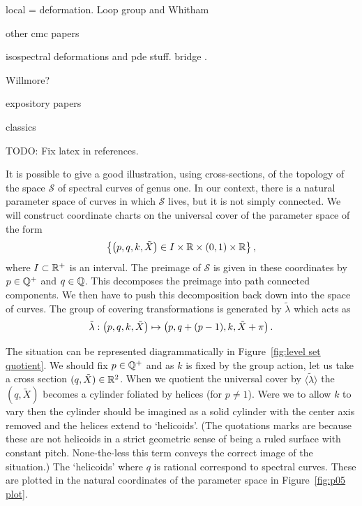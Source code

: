 \documentclass{article}
\begin{document}
local = deformation. Loop group and Whitham

other cmc papers \cite{Hauswirth2016}

isospectral deformations and pde stuff. bridge \cite{Kilian2010}. \cite{Flaschka1980}\cite{Krichever1995}

Willmore?

expository papers \cite{McIntosh2008}\cite{Carberry2013a}

classics \cite{Pinkall1989}\cite{Bobenko1991}

TODO: Fix latex in references.

It is possible to give a good illustration, using cross-sections, of the topology of the space $\mathcal{S}$ of spectral curves of genus one. In our context, there is a natural parameter space of curves in which $\mathcal{S}$ lives, but it is not simply connected. We will construct coordinate charts on the universal cover of the parameter space of the form
\[
\left\{ \left(p,q,k,\tilde{X}\right) \in I \times \mathbb{R} \times (0,1) \times \mathbb{R} \right\},
\]
where $I\subset\mathbb{R}^+$ is an interval. The preimage of $\mathcal{S}$ is given in these coordinates by $p\in\mathbb{Q}^+$ and $q\in\mathbb{Q}$. 
This decomposes the preimage into path connected components. 
We then have to push this decomposition back down into the space of curves.
The group of covering transformations is generated by $\tilde{\lambda}$ which acts as
\[
\tilde{\lambda} : \left(p,q,k,\tilde{X}\right) \mapsto \left(p,q + (p-1),k,\tilde{X} + \pi\right).
\]

The situation can be represented diagrammatically in Figure~\ref{fig:level set quotient}. We should fix $p\in\mathbb{Q}^+$ and as $k$ is fixed by the group action, let us take a cross section $(q,\tilde{X}) \in \mathbb{R}^2$. When we quotient the universal cover by $\langle\tilde{\lambda}\rangle$ the $(q,\tilde{X})$ becomes a cylinder foliated by helices (for $p\neq 1$). Were we to allow $k$ to vary then the cylinder should be imagined as a solid cylinder with the center axis removed and the helices extend to `helicoids'. (The quotations marks are because these are not helicoids in a strict geometric sense of being a ruled surface with constant pitch. None-the-less this term conveys the correct image of the situation.) The `helicoids' where $q$ is rational correspond to spectral curves. These are plotted in the natural coordinates of the parameter space in Figure~\ref{fig:p05 plot}.
\end{document}
